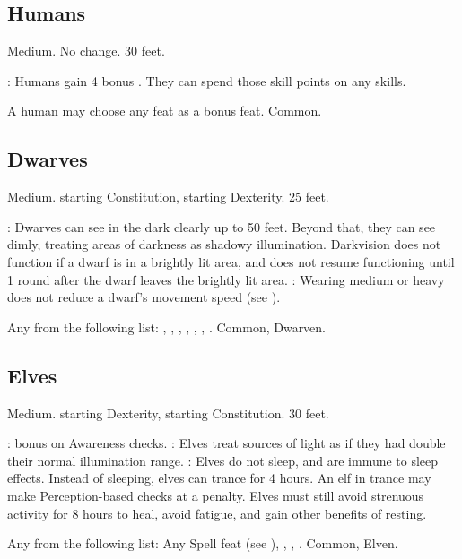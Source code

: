 \subsection{Humans}
 Medium.
 No change.
 30 feet.
\begin{itemize}
    : Humans gain 4 bonus . They can spend those skill points on any skills.
\end{itemize}
 A human may choose any feat as a bonus feat.
 Common.

\subsection{Dwarves}
 Medium.
  starting Constitution,  starting Dexterity.
 25 feet.
\begin{itemize}
    : Dwarves can see in the dark clearly up to 50 feet.   Beyond that, they can see dimly, treating areas of darkness as shadowy illumination. Darkvision does not function if a dwarf is in a brightly lit area, and does not resume functioning until 1 round after the dwarf leaves the brightly lit area.
    : Wearing medium or heavy  does not reduce a dwarf's movement speed (see ).
\end{itemize}
 Any from the following list: , , , , , , .
 Common, Dwarven.

\subsection{Elves}
 Medium.
  starting Dexterity,  starting Constitution.
 30 feet.
\begin{itemize}
    :  bonus on Awareness checks.
    : Elves treat sources of light as if they had double their normal illumination range.
    : Elves do not sleep, and are immune to sleep effects. Instead of sleeping, elves can trance for 4 hours. An elf in trance may make Perception-based checks at a  penalty. Elves must still avoid strenuous activity for 8 hours to heal, avoid fatigue, and gain other benefits of resting.
\end{itemize}
 Any from the following list: Any Spell feat (see ), , , .
 Common, Elven.

